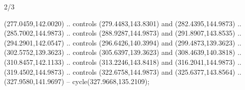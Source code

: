 \begin{flagdescription}{2/3}
\begin{scope}[xshift=0.5\flaglength,yshift=0.5\flagwidth,scale=\flagwidth/267]
\begin{scope}[y=0.8pt, x=0.8pt, yscale=-1,shift={(-250.31,-166.88)}]
  (277.0459,142.0020) .. controls (279.4483,143.8301) and (282.4395,144.9873) ..
  (285.7002,144.9873) .. controls (288.9287,144.9873) and (291.8907,143.8535) ..
  (294.2901,142.0547) .. controls (296.6426,140.3994) and (299.4873,139.3623) ..
  (302.5752,139.3623) .. controls (305.6397,139.3623) and (308.4639,140.3818) ..
  (310.8457,142.1133) .. controls (313.2246,143.8418) and (316.2041,144.9873) ..
  (319.4502,144.9873) .. controls (322.6758,144.9873) and (325.6377,143.8564) ..
  (327.9580,141.9697) -- cycle(327.9668,135.2109);
\end{scope}
\end{scope}
\framecode{}
\end{flagdescription}
